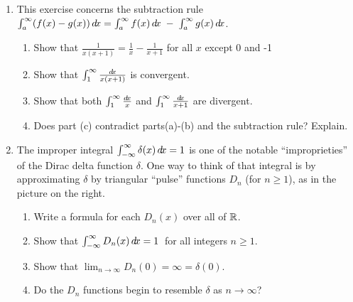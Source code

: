 {\begin{enumerate}[\bfseries 1.]
 each ``hump'' of $\sin x$ above the $x$-axis is canceled by one below the
 $x$-axis?
 \item This exercise concerns the subtraction rule
 $\int_a^{\infty} (f(x) - g(x))\,d\!x = \int_a^{\infty} f(x)\,d\!x \;-\;
 \int_a^{\infty} g(x)\,d\!x$.
 \begin{enumerate}[\bfseries (a)]
  \item  Show that $\frac{1}{x (x+1)} = \frac{1}{x} - \frac{1}{x+1}$
   for all $x$ except 0 and -1
  \item Show that $\int_1^{\infty} \frac{d\!x}{x (x+1)}$ is convergent.
  \item Show that both $\int_1^{\infty} \frac{d\!x}{x}$ and
  $\int_1^{\infty} \frac{d\!x}{x+1}$ are divergent.
  \item Does part (c) contradict parts(a)-(b) and the subtraction rule? Explain.
 \end{enumerate}
 \item The improper integral $\int_{-\infty}^{\infty} \delta(x)\,d\!x = 1$ is one
 of the notable ``improprieties'' of the Dirac delta function $\delta$.
 One way to think of that integral is by approximating $\delta$ by triangular
 ``pulse'' functions $D_n$ (for $n \ge 1$), as in the picture on the
 right.
 \begin{enumerate}[\bfseries (a)]
  \item Write a formula for each $D_n(x)$ over all of $\mathbb{R}$.
  \item Show that $\int_{-\infty}^{\infty} D_n(x)\,d\!x = 1\,$ for all integers
   $n \ge 1$.
  \item Show that $\lim_{n \to \infty} D_n(0) = \infty = \delta(0)$.
  \item Do the $D_n$ functions begin to resemble $\delta$ as $n \to \infty$?
 \end{enumerate}
\end{enumerate}
}
